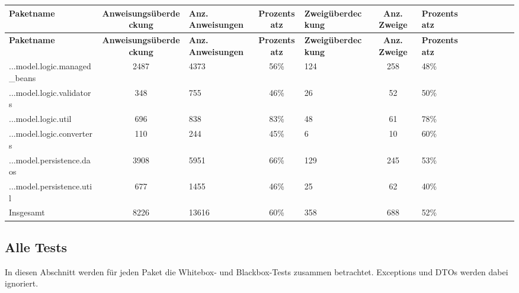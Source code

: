 \documentclass{article}
\begin{document}
\begin{longtable}{@{}lclclclclclcl@{}}
\toprule
\textbf{Paketname} & \textbf{Anweisungsüberdeckung} & \textbf{Anz. Anweisungen} & \textbf{Prozentsatz} & \textbf{Zweigüberdeckung} & \textbf{Anz. Zweige} & \textbf{Prozentsatz} \\* \midrule
\endfirsthead
\textbf{Paketname} & \textbf{Anweisungsüberdeckung} & \textbf{Anz. Anweisungen} & \textbf{Prozentsatz} & \textbf{Zweigüberdeckung} & \textbf{Anz. Zweige} & \textbf{Prozentsatz} \\* \midrule
\endhead
...model.logic.managed\_beans 	& 2487 		& 4373 		& 56\% 		& 124 		& 258 		& 48\% \\
...model.logic.validators 		& 348 		& 755 		& 46\% 		& 26 			& 52 			& 50\% \\
...model.logic.util 			& 696 		& 838 		& 83\% 		& 48 			& 61 			& 78\% \\
...model.logic.converters 		& 110 		& 244 		& 45\% 		& 6 			& 10 			& 60\% \\
...model.persistence.daos 		& 3908 		& 5951 		& 66\% 		& 129 		& 245 		& 53\% \\
...model.persistence.util 		& 677 		& 1455 		& 46\% 		& 25 			& 62 			& 40\% \\
Insgesamt 						& 8226            	& 13616            & 60\%            	& 358            	& 688            	& 52\% \\* \bottomrule
\end{longtable}

\subsection{Alle Tests}

In diesen Abschnitt werden für jeden Paket die Whitebox- und Blackbox-Tests zusammen betrachtet. Exceptions und DTOs werden dabei ignoriert.
\end{document}
